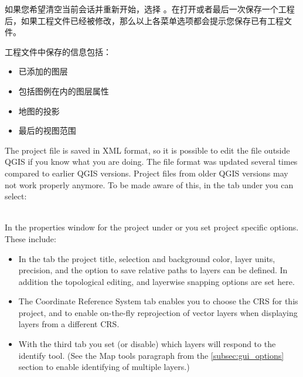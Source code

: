 如果您希望清空当前会话并重新开始，选择  \arrow {} 。在打开或者最后一次保存一个工程后，如果工程文件已经被修改，那么以上各菜单选项都会提示您保存已有工程文件。

工程文件中保存的信息包括：

\begin{itemize}
\item 已添加的图层
\item 包括图例在内的图层属性
\item 地图的投影
\item 最后的视图范围
\end{itemize}

The project file is saved in XML format, so it is possible to edit
the file outside QGIS if you know what you are doing. The file format
was updated several times compared to earlier QGIS versions. Project files
from older QGIS versions may not work properly anymore. To be made aware of this,
in the  tab under  \arrow {}
you can select: \\

 \\

In the properties window for the project under  or  you set project specific options. These
include:

\begin{itemize}
\item In the  tab the project title, selection and background
color, layer units, precision, and the option to save relative paths to
layers can be defined. In addition the topological editing, and layerwise
snapping options are set here.
\item The  Coordinate Reference System tab enables you to choose the
CRS for this project, and to enable on-the-fly reprojection of vector layers
when displaying layers from a different CRS.
\item With the third  tab you set (or disable) which
layers will respond to the identify tool. (See the Map tools paragraph from
the \ref{subsec:gui_options} section to enable identifying of multiple layers.)
\end{itemize}

